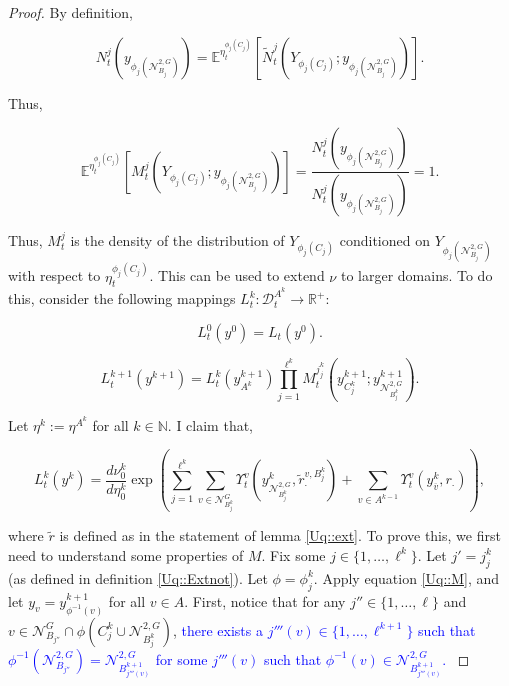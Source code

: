 \documentclass[12pt]{article}
\newcommand{\mb}{\mathbb}
\newcommand{\mc}{\mathcal}
\newcommand{\ra}{\rightarrow}
\newcommand{\ov}{\overline}
\newcommand{\tb}{\textcolor{blue}}
\newcommand{\exmu}[2]{\mb{E}^{#1}\left[#2\right]}	%
\newcommand{\defeq}{:=}								%
\newcommand{\cad}{\mc{D}}							%
\newcommand{\gneigh}[2]{\mc{N}^{#1}_{#2}}			%
\newcommand{\dgneigh}[2]{\mc{N}^{2,#1}_{#2}}		%
\newcommand{\cl}[1]{\ov{#1}}						%
\newcommand{\indx}[1]{^{#1}}						%
\newcommand{\rate}{r}								%
\newcommand{\xg}{y}									%
\newcommand{\vind}[1]{_{#1}}						%
\newcommand{\vpara}[1]{^{#1}}						%
\newcommand{\stpara}[1]{_{#1}}						%
\newcommand{\tpara}[1]{_{#1}}						%
\newcommand{\psize}{\ell}							%
\newcommand{\Xg}{Y}									%
\newcommand{\brate}{\alt{\rate}}					%
\newcommand{\alt}[1]{\tilde{#1}}					%
\newcommand{\mm}{\nu}								%
\newcommand{\mmm}{\eta}								%
\newcommand{\ds}{\Upsilon}							%
\newcommand{\dense}{L}								%
\newcommand{\densen}{N}								%
\newcommand{\denseph}{\alt{N}}						%
\newcommand{\mdense}{M}								%
\newcommand{\jpara}[1]{^{#1}}						%
\newcommand{\vjpara}[2]{^{#1,#2}}					%
\begin{document}
\begin{proof}
By definition, 

\[\densen\jpara{j}\tpara{t}(\xg\vind{\phi_j(\dgneigh{G}{B_j})}) = \exmu{\mmm\vpara{\phi_j(C_j)}\tpara{t}}{\denseph\jpara{j}\tpara{t}(\Xg\vind{\phi_j(C_j)};\xg\vind{\phi_j(\dgneigh{G}{B_j})})}.\]

Thus,

\[\exmu{\mmm\vpara{\phi_j(C_j)}\tpara{t}}{\mdense\jpara{j}\tpara{t}(\Xg\vind{\phi_j(C_j)};\xg\vind{\phi_j(\dgneigh{G}{B_j})})} = \frac{\densen\jpara{j}\tpara{t}(\xg\vind{\phi_j(\dgneigh{G}{B_j})})}{\densen\jpara{j}\tpara{t}(\xg\vind{\phi_j(\dgneigh{G}{B_j})})} = 1.\]

Thus, \(\mdense\jpara{j}\tpara{t}\) is the density of the distribution of \(\Xg\vind{\phi_j(C_j)}\) conditioned on \(\Xg\vind{\phi_j(\dgneigh{G}{B_j})}\) with respect to \(\mmm\vpara{\phi_j(C_j)}\tpara{t}\). This can be used to extend \(\mm\) to larger domains. To do this, consider the following mappings \(\dense\indx{k}\tpara{t}: \cad\vpara{A\indx{k}}\tpara{t} \ra \mb{R}^+\):

\[\dense\indx{0}\tpara{t}(\xg\indx{0}) = \dense\tpara{t}(\xg\indx{0}).\]

\[\dense\indx{k+1}\tpara{t}(\xg\indx{k+1}) = \dense\indx{k}\tpara{t}(\xg\indx{k+1}\vind{A\indx{k}})\prod_{j=1}^{\psize\indx{k}}\mdense\jpara{j\indx{k}_j}\tpara{t}\left(\xg\indx{k+1}\vind{C_j\indx{k}};\xg\indx{k+1}\vind{\dgneigh{G}{B\indx{k}_j}}\right).\]

Let \(\mmm\indx{k} \defeq \mmm\vpara{A\indx{k}}\) for all \(k\in \mb{N}\). I claim that,

\[\dense\indx{k}\tpara{t}(\xg\indx{k}) = \frac{d\mm\indx{k}\tpara{0}}{d\mmm\indx{k}\tpara{0}}\exp\left(\sum_{j=1}^{\psize\indx{k}}\sum_{v\in \gneigh{G}{B_j\indx{k}}} \ds\vpara{v}\tpara{t}\left(\xg\indx{k}\vind{\dgneigh{G}{B_j\indx{k}}},\brate\vjpara{v}{B\indx{k}_{j}}\stpara{\cdot}\right) + \sum_{v \in A\indx{k-1}} \ds\vpara{v}\tpara{t}\left(\xg\indx{k}\vind{\cl{v}},\rate\stpara{\cdot}\right)\right),\]

where \(\brate\) is defined as in the statement of lemma \ref{Uq::ext}. To prove this, we first need to understand some properties of \(\mdense\). Fix some \(j \in \{1,\dots,\psize\indx{k}\}\). Let \(j' = j\indx{k}_j\) (as defined in definition \ref{Uq::Extnot}). Let \(\phi = \phi\indx{k}_j\). Apply equation \eqref{Uq::M}, and let \(\xg\vind{v} = \xg\indx{k+1}\vind{\phi^{-1}(v)}\) for all \(v \in A\). First, notice that for any \(j'' \in \{1,\dots,\psize\}\) and \(v \in \gneigh{G}{B_{j''}}\cap\phi(C\indx{k}_j\cup\dgneigh{G}{B\indx{k}_{j}})\), \tb{there exists a \(j'''(v) \in \{1,\dots,\psize\indx{k+1}\}\) such that \(\phi^{-1}(\dgneigh{G}{B_{j''}}) = \dgneigh{G}{B\indx{k+1}_{j'''(v)}}\) for some \(j'''(v)\) such that \(\phi^{-1}(v) \in \dgneigh{G}{B\indx{k+1}_{j'''(v)}}\). }


\end{proof}
\end{document}
